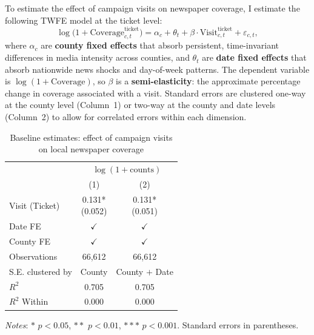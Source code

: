 \documentclass{article}
\begin{document}
To estimate the effect of campaign visits on newspaper coverage, I estimate the following
TWFE model at the ticket level:
\begin{equation}
\log\!\big(1+\text{Coverage}_{c,t}^{\text{ticket}}\big)
= \alpha_c + \theta_t + \beta \cdot \text{Visit}_{c,t}^{\text{ticket}} + \varepsilon_{c,t},
\label{eq:baseline}
\end{equation}
where $\alpha_c$ are \textbf{county fixed effects} that absorb persistent, time-invariant
differences in media intensity across counties, and $\theta_t$ are \textbf{date fixed
effects} that absorb nationwide news shocks and day-of-week patterns.
The dependent variable is $\log(1+\text{Coverage})$, so $\beta$ is a \textbf{semi-elasticity}:
the approximate percentage change in coverage associated with a visit.
Standard errors are clustered one-way at the county level (Column~1) or two-way at the
county and date levels (Column~2) to allow for correlated errors within each dimension.

\begin{table}[htbp]
\centering
\caption{Baseline estimates: effect of campaign visits on local newspaper coverage}
\label{tab:baseline}
\renewcommand\cellalign{t}
\begin{threeparttable}
\begin{tabular}{lcc}
\toprule
 & \multicolumn{2}{c}{$\log(1+\text{counts})$} \\
\cmidrule(lr){2-3}
 & (1) & (2) \\
\midrule
\addlinespace
Visit (Ticket) & \makecell{0.131* \\ (0.052)} & \makecell{0.131* \\ (0.051)} \\
\midrule
\addlinespace
Date FE        & $\checkmark$ & $\checkmark$ \\
County FE      & $\checkmark$ & $\checkmark$ \\
\midrule
\addlinespace
Observations   & 66,612 & 66,612 \\
S.E. clustered by & County & County $+$ Date \\
$R^2$          & 0.705 & 0.705 \\
$R^2$ Within   & 0.000 & 0.000 \\
\bottomrule
\end{tabular}
\begin{tablenotes}
\footnotesize
\item \textit{Notes}: $*$ $p<0.05$, $**$ $p<0.01$, $***$ $p<0.001$.
      Standard errors in parentheses.
\end{tablenotes}
\end{threeparttable}
\end{table}
\end{document}
